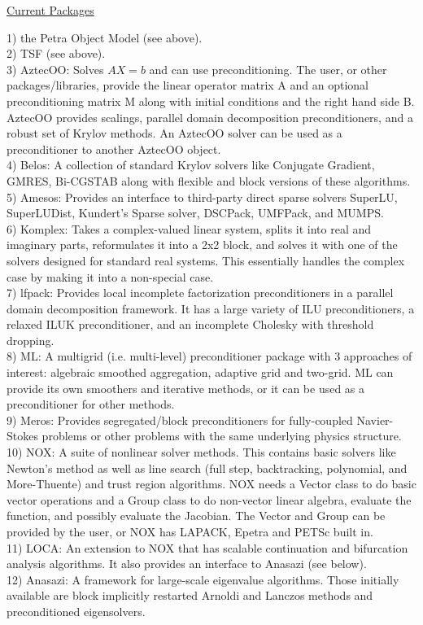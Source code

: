 \documentclass[12pt,twoside]{article}
\begin{document}
\begin{flushleft}
\underline{Current Packages}

1) the Petra Object Model (see above). 
\\
2) TSF (see above).
 \\
3) AztecOO: Solves $AX = b$ and can use preconditioning. The user, or other packages/libraries, provide the linear operator matrix A and an optional preconditioning matrix M along with initial conditions and the right hand side B. AztecOO provides scalings, parallel domain decomposition preconditioners, and a robust set of Krylov methods. An AztecOO solver can be used as a preconditioner to another AztecOO object.
\\
4) Belos: A collection of standard Krylov solvers like Conjugate Gradient, GMRES, Bi-CGSTAB along with flexible and block versions of these algorithms. 
\\
5) Amesos: Provides an interface to third-party direct sparse solvers SuperLU, SuperLUDist, Kundert's Sparse solver, DSCPack, UMFPack, and MUMPS.
\\
6) Komplex: Takes a complex-valued linear system, splits it into real and imaginary parts, reformulates it into a 2x2 block, and solves it with one of the solvers designed for standard real systems. This essentially handles the complex case by making it into a non-special case. 
\\
7) lfpack: Provides local incomplete factorization preconditioners in a parallel domain decomposition framework. It has a large variety of ILU preconditioners, a relaxed ILUK preconditioner, and an incomplete Cholesky with threshold dropping.
\\
8) ML: A multigrid (i.e. multi-level) preconditioner package with 3 approaches of interest: algebraic smoothed aggregation, adaptive grid and two-grid. ML can provide its own smoothers and iterative methods, or it can be used as a preconditioner for other methods. 
\\
9) Meros: Provides segregated/block preconditioners for fully-coupled Navier-Stokes problems or other problems with the same underlying physics structure. 
\\
10) NOX: A suite of nonlinear solver methods. This contains basic solvers like Newton's method as well as line search (full step, backtracking, polynomial, and More-Thuente) and trust region algorithms. NOX needs a Vector class to do basic vector operations and a Group class to do non-vector linear algebra, evaluate the function, and possibly evaluate the Jacobian. The Vector and Group can be provided by the user, or NOX has LAPACK, Epetra and PETSc built in. 
\\
11) LOCA: An extension to NOX that has scalable continuation and bifurcation analysis algorithms. It also provides an interface to Anasazi (see below). 
\\
12) Anasazi: A framework for large-scale eigenvalue algorithms. Those initially available are block implicitly restarted Arnoldi and Lanczos methods and preconditioned eigensolvers.
\end{flushleft}
\end{document}
